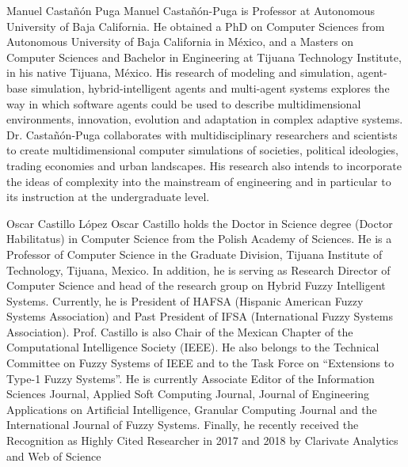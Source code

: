 \documentclass{ieeeaccess}
\begin{document}
\begin{IEEEbiography}{Manuel
Castañón Puga} Manuel Castañón-Puga is Professor at Autonomous University of
Baja California. He obtained a PhD on Computer Sciences from Autonomous
University of Baja California in México, and a Masters on Computer Sciences and
Bachelor in Engineering at Tijuana Technology Institute, in his native Tijuana,
México. His research of modeling and simulation, agent-base simulation,
hybrid-intelligent agents and multi-agent systems explores the way in which
software agents could be used to describe multidimensional environments,
innovation, evolution and adaptation in complex adaptive systems. Dr.
Castañón-Puga collaborates with multidisciplinary researchers and scientists to
create multidimensional computer simulations of societies, political ideologies,
trading economies and urban landscapes. His research also intends to incorporate
the ideas of complexity into the mainstream of engineering and in particular to
its instruction at the undergraduate level. \end{IEEEbiography}


\begin{IEEEbiography}{Oscar
Castillo López} Oscar Castillo holds the Doctor in Science degree (Doctor
Habilitatus) in Computer Science from the Polish Academy of Sciences.
He is a Professor of Computer Science in the Graduate Division, Tijuana
Institute of Technology, Tijuana, Mexico. In addition, he is serving as Research
Director of Computer Science and head of the research group on Hybrid Fuzzy
Intelligent Systems. Currently, he is President of HAFSA (Hispanic American
Fuzzy Systems Association) and Past President of IFSA (International Fuzzy
Systems Association). Prof. Castillo is also Chair of the Mexican Chapter of the
Computational Intelligence Society (IEEE). He also belongs to the Technical
Committee on Fuzzy Systems of IEEE and to the Task Force on “Extensions to
Type-1 Fuzzy Systems”. He is currently Associate Editor of the Information
Sciences Journal, Applied Soft Computing Journal, Journal of Engineering
Applications on Artificial Intelligence, Granular Computing Journal and the
International Journal of Fuzzy Systems. Finally, he recently received the Recognition as
Highly Cited Researcher in 2017 and 2018 by Clarivate Analytics and Web of
Science \end{IEEEbiography}




\EOD
\end{document}
